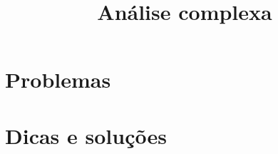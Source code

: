 \documentclass[brazilian,a4paper]{scrartcl}
\title{Análise complexa}
\begin{document}
\maketitle
\tableofcontents

\appendix
\newpage
\section{Problemas}

\newpage
\section{Dicas e soluções}

\end{document}
